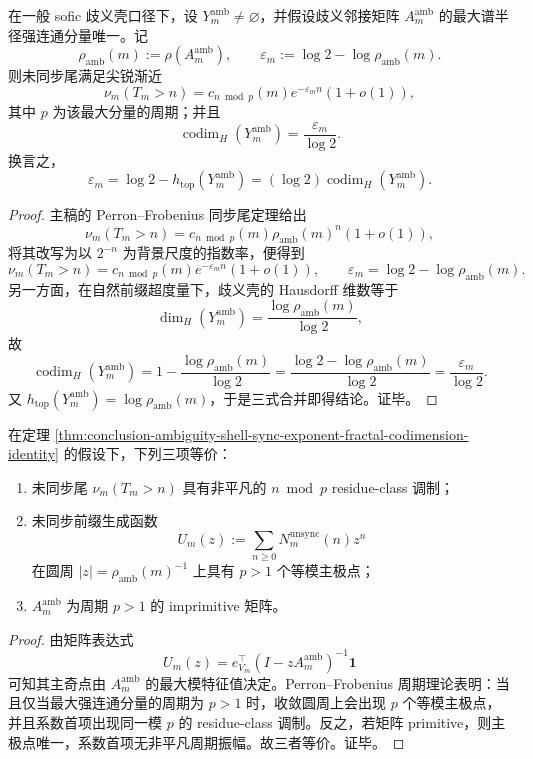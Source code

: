 \begin{theorem}\label{thm:conclusion-ambiguity-shell-sync-exponent-fractal-codimension-identity}
在一般 sofic 歧义壳口径下，设 \(Y_m^{\mathrm{amb}}\neq\varnothing\)，并假设歧义邻接矩阵 \(A_m^{\mathrm{amb}}\) 的最大谱半径强连通分量唯一。记
\[
\rho_{\mathrm{amb}}(m):=\rho(A_m^{\mathrm{amb}}),
\qquad
\varepsilon_m:=\log 2-\log \rho_{\mathrm{amb}}(m).
\]
则未同步尾满足尖锐渐近
\[
\nu_m(T_m>n)=c_{n\bmod p}(m)e^{-\varepsilon_m n}(1+o(1)),
\]
其中 \(p\) 为该最大分量的周期；并且
\[
\operatorname{codim}_H(Y_m^{\mathrm{amb}})
=
\frac{\varepsilon_m}{\log 2}.
\]
换言之，
\[
\varepsilon_m
=
\log 2-h_{\mathrm{top}}(Y_m^{\mathrm{amb}})
=
(\log 2)\operatorname{codim}_H(Y_m^{\mathrm{amb}}).
\]
\end{theorem}
\begin{proof}
主稿的 Perron--Frobenius 同步尾定理给出
\[
\nu_m(T_m>n)=c_{n\bmod p}(m)\rho_{\mathrm{amb}}(m)^n(1+o(1)),
\]
将其改写为以 \(2^{-n}\) 为背景尺度的指数率，便得到
\[
\nu_m(T_m>n)=c_{n\bmod p}(m)e^{-\varepsilon_m n}(1+o(1)),
\qquad
\varepsilon_m=\log 2-\log\rho_{\mathrm{amb}}(m).
\]
另一方面，在自然前缀超度量下，歧义壳的 Hausdorff 维数等于
\[
\dim_H(Y_m^{\mathrm{amb}})=\frac{\log \rho_{\mathrm{amb}}(m)}{\log 2},
\]
故
\[
\operatorname{codim}_H(Y_m^{\mathrm{amb}})
=
1-\frac{\log \rho_{\mathrm{amb}}(m)}{\log 2}
=
\frac{\log 2-\log \rho_{\mathrm{amb}}(m)}{\log 2}
=
\frac{\varepsilon_m}{\log 2}.
\]
又 \(h_{\mathrm{top}}(Y_m^{\mathrm{amb}})=\log\rho_{\mathrm{amb}}(m)\)，于是三式合并即得结论。证毕。
\end{proof}

\begin{corollary}[周期调制与主奇点星簇的等价性]\label{cor:conclusion-ambiguity-shell-periodic-modulation-pole-star-equivalence}
在定理 \ref{thm:conclusion-ambiguity-shell-sync-exponent-fractal-codimension-identity} 的假设下，下列三项等价：
\begin{enumerate}
  \item 未同步尾 \(\nu_m(T_m>n)\) 具有非平凡的 \(n\bmod p\) residue-class 调制；
  \item 未同步前缀生成函数
  \[
  U_m(z):=\sum_{n\ge 0}N_m^{\mathrm{unsync}}(n)z^n
  \]
  在圆周 \(|z|=\rho_{\mathrm{amb}}(m)^{-1}\) 上具有 \(p>1\) 个等模主极点；
  \item \(A_m^{\mathrm{amb}}\) 为周期 \(p>1\) 的 imprimitive 矩阵。
\end{enumerate}
\end{corollary}
\begin{proof}
由矩阵表达式
\[
U_m(z)=e_{V_m}^{\top}(I-zA_m^{\mathrm{amb}})^{-1}\mathbf 1
\]
可知其主奇点由 \(A_m^{\mathrm{amb}}\) 的最大模特征值决定。Perron--Frobenius 周期理论表明：当且仅当最大强连通分量的周期为 \(p>1\) 时，收敛圆周上会出现 \(p\) 个等模主极点，并且系数首项出现同一模 \(p\) 的 residue-class 调制。反之，若矩阵 primitive，则主极点唯一，系数首项无非平凡周期振幅。故三者等价。证毕。
\end{proof}

